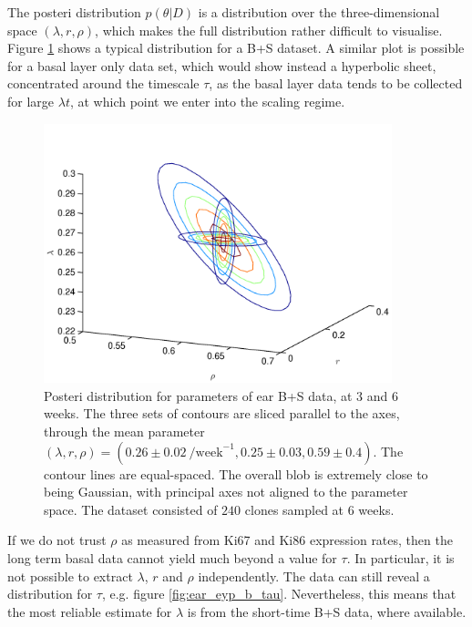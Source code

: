 \documentclass[10pt,english]{article}
\begin{document}
The posteri distribution $p(\theta|D)$ is a distribution over the three-dimensional space $(\lambda, r, \rho)$, which makes the full distribution rather difficult to visualise. Figure \ref{fig:ear_eyp_bs_3d} shows a typical distribution for a B+S dataset. A similar plot is possible for a basal layer only data set, which would show instead a hyperbolic sheet, concentrated around the timescale $\tau$, as the basal layer data tends to be collected for large $\lambda t$, at which point we enter into the scaling regime.

\begin{figure}[htb]
	\centering
	\includegraphics[width=0.9\textwidth]{ABC/ear_eyp_bs.png}
	\caption{\label{fig:ear_eyp_bs_3d}Posteri distribution for parameters of ear B+S data, at $3$ and $6$ weeks. The three sets of contours are sliced parallel to the axes, through the mean parameter $(\lambda, r, \rho) = (0.26 \pm 0.02~\textrm{/week}^{-1}, 0.25 \pm 0.03, 0.59 \pm 0.4).$ The contour lines are equal-spaced. The overall blob is extremely close to being Gaussian, with principal axes not aligned to the parameter space. The dataset consisted of $240$ clones sampled at $6$ weeks.}
\end{figure}

If we do not trust $\rho$ as measured from Ki67 and Ki86 expression rates, then the long term basal data cannot yield much beyond a value for $\tau$. In particular, it is not possible to extract $\lambda$, $r$ and $\rho$ independently. The data can still reveal a distribution for $\tau$, e.g. figure \ref{fig:ear_eyp_b_tau}. Nevertheless, this means that the most reliable estimate for $\lambda$ is from the short-time B+S data, where available.
\end{document}
